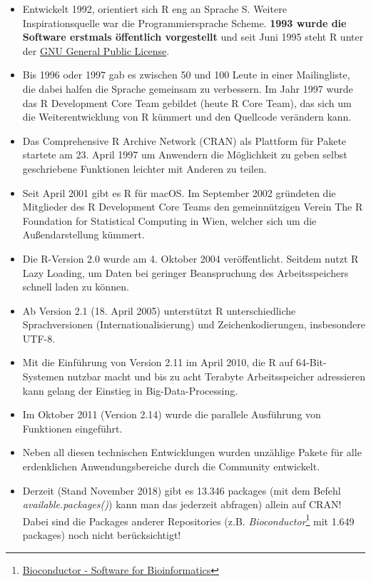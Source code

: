 \documentclass[]{article}
\providecommand{\tightlist}{%
  \setlength{\itemsep}{0pt}\setlength{\parskip}{0pt}}
\let\rmarkdownfootnote\footnote%
\def\footnote{\protect\rmarkdownfootnote}
\begin{document}
\begin{itemize}
\tightlist
\item
  Entwickelt 1992, orientiert sich R eng an Sprache S. Weitere
  Inspirationsquelle war die Programmiersprache Scheme. \textbf{1993
  wurde die Software erstmals öffentlich vorgestellt} und seit Juni 1995
  steht R unter der
  \href{https://de.wikipedia.org/wiki/GNU_General_Public_License}{GNU
  General Public License}.
\item
  Bis 1996 oder 1997 gab es zwischen 50 und 100 Leute in einer
  Mailingliste, die dabei halfen die Sprache gemeinsam zu verbessern. Im
  Jahr 1997 wurde das R Development Core Team gebildet (heute R Core
  Team), das sich um die Weiterentwicklung von R kümmert und den
  Quellcode verändern kann.
\item
  Das Comprehensive R Archive Network (CRAN) als Plattform für Pakete
  startete am 23. April 1997 um Anwendern die Möglichkeit zu geben
  selbst geschriebene Funktionen leichter mit Anderen zu teilen.
\item
  Seit April 2001 gibt es R für macOS. Im September 2002 gründeten die
  Mitglieder des R Development Core Teams den gemeinnützigen Verein The
  R Foundation for Statistical Computing in Wien, welcher sich um die
  Außendarstellung kümmert.
\item
  Die R-Version 2.0 wurde am 4. Oktober 2004 veröffentlicht. Seitdem
  nutzt R Lazy Loading, um Daten bei geringer Beanspruchung des
  Arbeitsspeichers schnell laden zu können.
\item
  Ab Version 2.1 (18. April 2005) unterstützt R unterschiedliche
  Sprachversionen (Internationalisierung) und Zeichenkodierungen,
  insbesondere UTF-8.
\item
  Mit die Einführung von Version 2.11 im April 2010, die R auf
  64-Bit-Systemen nutzbar macht und bis zu acht Terabyte Arbeitsspeicher
  adressieren kann gelang der Einstieg in Big-Data-Processing.
\item
  Im Oktober 2011 (Version 2.14) wurde die parallele Ausführung von
  Funktionen eingeführt.
\item
  Neben all diesen technischen Entwicklungen wurden unzählige Pakete für
  alle erdenklichen Anwendungsbereiche durch die Community entwickelt.
\item
  Derzeit (Stand November 2018) gibt es 13.346 packages (mit dem Befehl
  \emph{available.packages()}) kann man das jederzeit abfragen) allein
  auf CRAN! Dabei sind die Packages anderer Repositories (z.B.
  \emph{Bioconductor}\footnote{\href{https://www.bioconductor.org/}{Bioconductor
    - Software for Bioinformatics}} mit 1.649 packages) noch nicht
  berücksichtigt!
\end{itemize}
\end{document}

